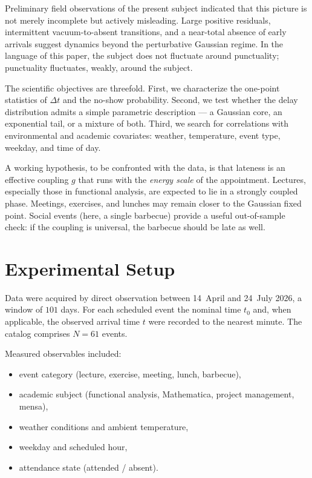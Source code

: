 \documentclass[10pt,twocolumn]{article}
\begin{document}
Preliminary field observations of the present subject indicated
that this picture is not merely incomplete but actively misleading.
Large positive residuals, intermittent vacuum-to-absent transitions,
and a near-total absence of early arrivals suggest dynamics beyond
the perturbative Gaussian regime. In the language of this paper,
the subject does not fluctuate around punctuality; punctuality
fluctuates, weakly, around the subject.

The scientific objectives are threefold.
First, we characterize the one-point statistics of $\Delta t$
and the no-show probability.
Second, we test whether the delay distribution admits a simple
parametric description --- a Gaussian core, an exponential tail,
or a mixture of both.
Third, we search for correlations with environmental and academic
covariates: weather, temperature, event type, weekday, and time of
day.

A working hypothesis, to be confronted with the data, is that
lateness is an effective coupling $g$ that runs with the
\textit{energy scale} of the appointment. Lectures, especially those
in functional analysis, are expected to lie in a strongly coupled
phase. Meetings, exercises, and lunches may remain closer to the
Gaussian fixed point. Social events (here, a single barbecue)
provide a useful out-of-sample check: if the coupling is universal,
the barbecue should be late as well.

\section{Experimental Setup}

Data were acquired by direct observation between 14~April and
24~July 2026, a window of $101$ days. For each scheduled event
the nominal time $t_0$ and, when applicable, the observed arrival
time $t$ were recorded to the nearest minute. The catalog
comprises $N=61$ events.

Measured observables included:
\begin{itemize}[leftmargin=0.4cm]
    \item event category
          (lecture, exercise, meeting, lunch, barbecue),
    \item academic subject
          (functional analysis, Mathematica, project management,
          mensa),
    \item weather conditions and ambient temperature,
    \item weekday and scheduled hour,
    \item attendance state (attended / absent).
\end{itemize}
\end{document}
